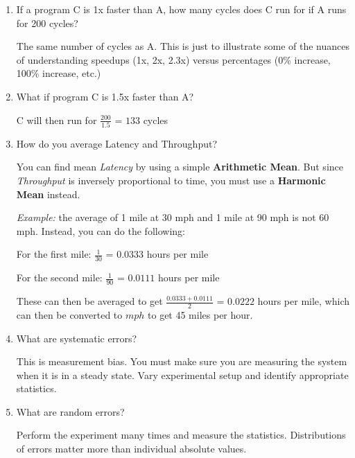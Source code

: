\documentclass[12pt]{article}
\newenvironment{QandA}{\begin{enumerate}[label=\bfseries\alph*.]\bfseries}
                      {\end{enumerate}}
\newenvironment{answered}{\par\quad\normalfont}{}
\begin{document}
\begin{QandA}
    \item If a program C is 1x faster than A, how many cycles does C run for if A runs for 200 cycles?
        \begin{answered}
        The same number of cycles as A. This is just to illustrate some of the nuances of understanding speedups (1x, 2x, 2.3x) versus percentages (0\% increase, 100\% increase, etc.)  
        \end{answered}
    
    \item What if program C is 1.5x faster than A?
        \begin{answered}
        C will then run for $\frac{200}{1.5}$ = $133$ cycles
        \end{answered}
        
    \item How do you average Latency and Throughput?
        \begin{answered}
        You can find mean \textit{Latency} by using a simple \textbf{Arithmetic Mean}. But since \textit{Throughput} is inversely proportional to time, you must use a \textbf{Harmonic Mean} instead. 
        
        \textit{Example:} the average of 1 mile at 30 mph and 1 mile at 90 mph is not 60 mph. Instead, you can do the following:
        
        For the first mile: $\frac{1}{30}$ = $0.0333$ hours per mile
        
        For the second mile: $\frac{1}{90}$ = $0.0111$ hours per mile
        
        These can then be averaged to get $\frac{0.0333+0.0111}{2}$ = $0.0222$ hours per mile, which can then be converted to $mph$ to get 45 miles per hour.
        \end{answered}
        
    \item What are systematic errors?
        \begin{answered}
        This is measurement bias. You must make sure you are measuring the system when it is in a steady state. Vary experimental setup and identify appropriate statistics.
        \end{answered}
        
    \item What are random errors?
        \begin{answered}
        Perform the experiment many times and measure the statistics. Distributions of errors matter more than individual absolute values.
        \end{answered}
        

\end{QandA}
\end{document}

